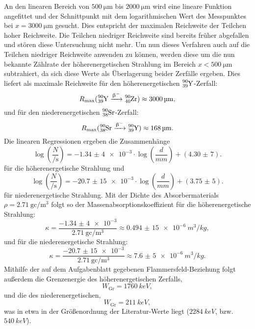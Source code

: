 An den linearen Bereich von $\SI{500}{\micro\meter}$ bis $\SI{2000}{\micro\meter}$ wird eine lineare Funktion angefittet und der Schnittpunkt mit dem logarithmischen Wert des Messpunktes bei $x=\SI{3000}{\micro\meter}$ gesucht. Dies entspricht der maximalen Reichweite der Teilchen hoher Reichweite. Die Teilchen niedriger Reichweite sind bereits früher abgefallen und stören diese Untersuchung nicht mehr. Um nun dieses Verfahren auch auf die Teilchen niedriger Reichweite anwenden zu können, werden diese um die nun bekannte Zählrate der höherenergetischen Strahlung im Bereich $x < \SI{500}{\micro\meter}$ subtrahiert, da sich diese Werte als Überlagerung beider Zerfälle ergeben. Dies liefert als maximale Reichweite für den höherenergetischen $\ce{_{39}^{90} Y}$-Zerfall:
\begin{equation}
R_\mathrm{max} (\ce{_{39}^{90} Y} \xrightarrow{\upbeta^-} \ce{_{40}^{90} Zr}) \approx \SI{3000}{\micro\meter},
\end{equation}
und für den niederenergetischen $\ce{_{38}^{90} Sr}$-Zerfall:
\begin{equation}
R_\mathrm{max} (\ce{_{38}^{90} Sr} \xrightarrow{\upbeta^-} \ce{_{39}^{90} Y}) \approx \SI{168}{\micro\meter}.
\end{equation}
Die linearen Regressionen ergeben die Zusammenhänge
\begin{equation}
\log\left(\frac{N}{\si{\per\second}}\right) = \num{-1,34(4)e-3} \cdot \log\left(\frac{d}{\si{mm}}\right) + (\num{4,30(7)}).
\end{equation}
für die höherenergetische Strahlung und
\begin{equation}
\log\left(\frac{N}{\si{\per\second}}\right) = \num{-20,7(15)e-3} \cdot \log\left(\frac{d}{\si{mm}}\right) + (\num{3,75(5)}).
\end{equation}
für niederenergetische Strahlung. Mit der Dichte des Absorbermaterials $\rho=\SI{2,71}{\gram\centi\per\meter^3}$ folgt so der Massenabsorptionskoeffizient für die höherenergetische Strahlung:
\begin{equation}
\kappa = \frac{\num{-1,34(4)e-3}}{\SI{2,71}{\gram\centi\per\meter^3}} \approx \SI{0,494(15)e-6}{m^3/kg},
\end{equation}
und für die niederenergetische Strahlung:
\begin{equation}
\kappa = \frac{\num{-20,7(15)e-3}}{\SI{2,71}{\gram\centi\per\meter^3}} \approx \SI{7,6(5)e-6}{m^3/kg}.
\end{equation}
Mithilfe der auf dem Aufgabenblatt gegebenen Flammersfeld-Beziehung folgt außerdem die Grenzenergie des höherenergetischen Zerfalls,
\begin{equation}
W_\mathrm{Gr} = \SI{1760}{keV},
\end{equation}
und die des niederenergetischen,
\begin{equation}
W_\mathrm{Gr} = \SI{211}{keV},
\end{equation}
was in etwa in der Größenordnung der Literatur-Werte liegt ($\SI{2284}{keV}$, bzw. $\SI{540}{keV}$).


